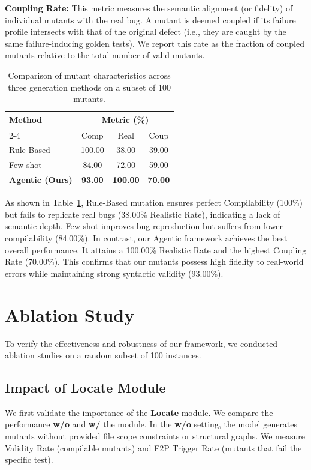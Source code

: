 \documentclass[11pt]{article}
\begin{document}
 \textbf{Coupling Rate:} This metric measures the semantic alignment (or fidelity) of individual mutants with the real bug. A mutant is deemed coupled if its failure profile intersects with that of the original defect (i.e., they are caught by the same failure-inducing golden tests). We report this rate as the fraction of coupled mutants relative to the total number of valid mutants.
 \begin{table}[h]
  \centering
  \small
  \renewcommand{\arraystretch}{1.2}
  \setlength{\tabcolsep}{3.5pt}
  \caption{
    Comparison of mutant characteristics across three generation methods on a subset of 100 mutants.
  }
  \begin{tabular}{l ccc}
    \toprule
    \multirow{2}{*}{Method} & \multicolumn{3}{c}{Metric (\%)} \\
    \cmidrule(lr){2-4}
    & Comp & Real & Coup  \\
    \midrule
    Rule-Based       & 100.00 & 38.00 & 39.00 \\
    Few-shot         & 84.00 & 72.00 & 59.00 \\
    \textbf{Agentic (Ours)} & \textbf{93.00} & \textbf{100.00} & \textbf{70.00} \\
    \bottomrule
  \end{tabular}
  \label{tab:se_metrics}
\end{table}

As shown in Table~\ref{tab:se_metrics}, Rule-Based mutation ensures perfect Compilability (100\%) but fails to replicate real bugs (38.00\% Realistic Rate), indicating a lack of semantic depth. Few-shot improves bug reproduction but suffers from lower compilability (84.00\%). In contrast, our Agentic framework achieves the best overall performance. It attains a 100.00\% Realistic Rate and the highest Coupling Rate (70.00\%). This confirms that our mutants possess high fidelity to real-world errors while maintaining strong syntactic validity (93.00\%).
\section{Ablation Study}
\label{sec:ablation}

To verify the effectiveness and robustness of our framework, we conducted ablation studies on a random subset of 100 instances.

\subsection{Impact of Locate Module}
We first validate the importance of the \textbf{Locate} module. We compare the performance \textbf{w/o} and \textbf{w/} the module. In the \textbf{w/o} setting, the model generates mutants without provided file scope constraints or structural graphs. We measure Validity Rate (compilable mutants) and F2P Trigger Rate (mutants that fail the specific test).
\end{document}
